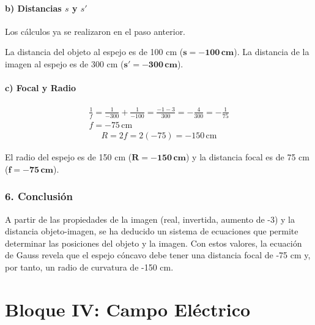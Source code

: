 \paragraph{b) Distancias $s$ y $s'$}
Los cálculos ya se realizaron en el paso anterior.
\begin{cajaresultado}
La distancia del objeto al espejo es de 100 cm ($\boldsymbol{s = -100\,\textbf{cm}}$). La distancia de la imagen al espejo es de 300 cm ($\boldsymbol{s' = -300\,\textbf{cm}}$).
\end{cajaresultado}
\paragraph{c) Focal y Radio}
\begin{gather}
    \frac{1}{f} = \frac{1}{-300} + \frac{1}{-100} = \frac{-1 - 3}{300} = -\frac{4}{300} = -\frac{1}{75} \\
    f = -75 \, \text{cm}
\end{gather}
\begin{gather}
    R = 2f = 2(-75) = -150 \, \text{cm}
\end{gather}
\begin{cajaresultado}
El radio del espejo es de 150 cm ($\boldsymbol{R = -150\,\textbf{cm}}$) y la distancia focal es de 75 cm ($\boldsymbol{f = -75\,\textbf{cm}}$).
\end{cajaresultado}

\subsubsection*{6. Conclusión}
\begin{cajaconclusion}
A partir de las propiedades de la imagen (real, invertida, aumento de -3) y la distancia objeto-imagen, se ha deducido un sistema de ecuaciones que permite determinar las posiciones del objeto y la imagen. Con estos valores, la ecuación de Gauss revela que el espejo cóncavo debe tener una distancia focal de -75 cm y, por tanto, un radio de curvatura de -150 cm.
\end{cajaconclusion}

\newpage

\section{Bloque IV: Campo Eléctrico}
\label{sec:em_2010_jun_ord}


